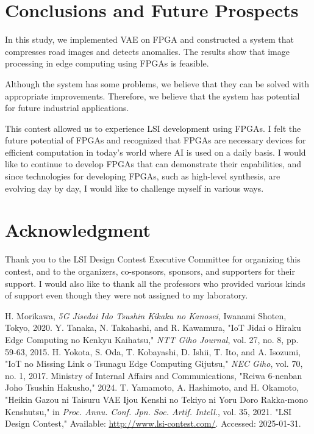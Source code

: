 \documentclass[conference]{IEEEtran}
\begin{document}
\section{Conclusions and Future Prospects}
In this study, we implemented VAE on FPGA and constructed a system that compresses road images and detects anomalies.
The results show that image processing in edge computing using FPGAs is feasible.

Although the system has some problems, we believe that they can be solved with appropriate improvements.
Therefore, we believe that the system has potential for future industrial applications.

This contest allowed us to experience LSI development using FPGAs.
I felt the future potential of FPGAs and recognized that FPGAs are necessary devices for efficient computation in today's world where AI is used on a daily basis.
I would like to continue to develop FPGAs that can demonstrate their capabilities, and since technologies for developing FPGAs, such as high-level synthesis, are evolving day by day, I would like to challenge myself in various ways.

\section*{Acknowledgment}
Thank you to the LSI Design Contest Executive Committee for organizing this contest, and to the organizers, co-sponsors, sponsors, and supporters for their support.
I would also like to thank all the professors who provided various kinds of support even though they were not assigned to my laboratory.

\begin{thebibliography}{10}
H. Morikawa, \textit{5G Jisedai Ido Tsushin Kikaku no Kanosei}, Iwanami Shoten, Tokyo, 2020.
Y. Tanaka, N. Takahashi, and R. Kawamura, "IoT Jidai o Hiraku Edge Computing no Kenkyu Kaihatsu," \textit{NTT Giho Journal}, vol. 27, no. 8, pp. 59-63, 2015.
H. Yokota, S. Oda, T. Kobayashi, D. Ishii, T. Ito, and A. Isozumi, "IoT no Missing Link o Tsunagu Edge Computing Gijutsu," \textit{NEC Giho}, vol. 70, no. 1, 2017.
Ministry of Internal Affairs and Communications, "Reiwa 6-nenban Joho Tsushin Hakusho," 2024.
T. Yamamoto, A. Hashimoto, and H. Okamoto, "Heikin Gazou ni Taisuru VAE Ijou Kenshi no Tekiyo ni Yoru Doro Rakka-mono Kenshutsu," in \textit{Proc. Annu. Conf. Jpn. Soc. Artif. Intell.}, vol. 35, 2021.
"LSI Design Contest," Available: \url{http://www.lsi-contest.com/}. Accessed: 2025-01-31.
\end{thebibliography}
\vspace{12pt}
\end{document}
